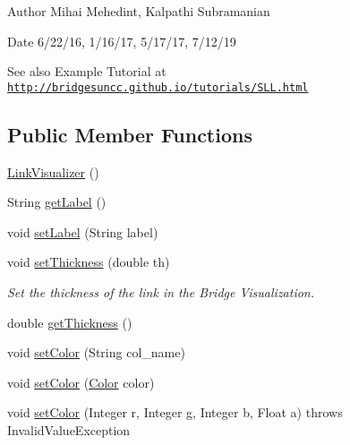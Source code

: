 \begin{DoxyAuthor}{Author}
Mihai Mehedint, Kalpathi Subramanian
\end{DoxyAuthor}
\begin{DoxyDate}{Date}
6/22/16, 1/16/17, 5/17/17, 7/12/19
\end{DoxyDate}
\begin{DoxySeeAlso}{See also}
Example Tutorial at ~\newline
 \href{http://bridgesuncc.github.io/tutorials/SLL.html}{\tt http\+://bridgesuncc.\+github.\+io/tutorials/\+S\+L\+L.\+html} 
\end{DoxySeeAlso}
\subsection*{Public Member Functions}
\begin{DoxyCompactItemize}
\item 
\hyperlink{classbridges_1_1base_1_1_link_visualizer_a0b69f099fa264ae9097b0efe278c6a1b}{Link\+Visualizer} ()
\item 
String \hyperlink{classbridges_1_1base_1_1_link_visualizer_a9ed60a0f8a337cd2c98b2d6ab07b8601}{get\+Label} ()
\item 
void \hyperlink{classbridges_1_1base_1_1_link_visualizer_a073d84e04dd95c3848c9f4e0ad74eb77}{set\+Label} (String label)
\item 
void \hyperlink{classbridges_1_1base_1_1_link_visualizer_a702e9ca345d1a4a035baf2041f275849}{set\+Thickness} (double th)
\begin{DoxyCompactList}\small\item\em Set the thickness of the link in the Bridge Visualization. \end{DoxyCompactList}\item 
double \hyperlink{classbridges_1_1base_1_1_link_visualizer_af1592d2a8664b00c1a51fdc0f8d1860a}{get\+Thickness} ()
\item 
void \hyperlink{classbridges_1_1base_1_1_link_visualizer_a92f306dbd73b961befa8ab4c0620a89e}{set\+Color} (String col\+\_\+name)
\item 
void \hyperlink{classbridges_1_1base_1_1_link_visualizer_ab05a7576f99818937276a4937eedeee1}{set\+Color} (\hyperlink{classbridges_1_1base_1_1_color}{Color} color)
\item 
void \hyperlink{classbridges_1_1base_1_1_link_visualizer_a003905cfe33e1704555b2b3a1cf99bad}{set\+Color} (Integer r, Integer g, Integer b, Float a)  throws Invalid\+Value\+Exception 
\item 

\end{DoxyCompactItemize}
